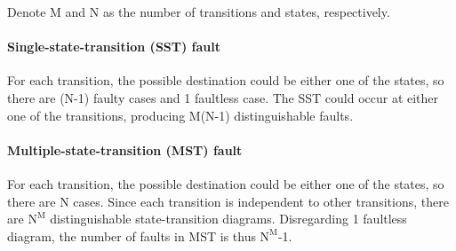 Denote M and N as the number of transitions and states, respectively. 
\paragraph{Single-state-transition (SST) fault}
For each transition, the possible destination could be either one of the states, so there are (N-1) faulty cases and 1 faultless case. The SST could occur at either one of the transitions, producing M(N-1) distinguishable faults.
\paragraph{Multiple-state-transition (MST) fault}
For each transition, the possible destination could be either one of the states, so there are N cases. Since each transition is independent to other transitions, there are $\text{N}^\text{M}$ distinguishable state-transition diagrams. Disregarding 1 faultless diagram, the number of faults in MST is thus $\text{N}^\text{M}$-1.

